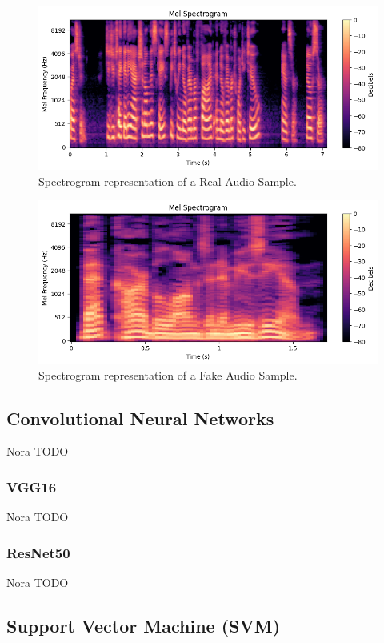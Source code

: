 \documentclass[sigconf,authordraft]{acmart}
\begin{document}
\begin{figure}
  \centering
  \includegraphics[width=\linewidth]{images/real_spectrogram.png}
  \caption{Spectrogram representation of a Real Audio Sample.}
  \label{fig:real_spectrogram}
\end{figure}

\begin{figure}
  \centering
  \includegraphics[width=\linewidth]{images/fake_spectrogram.png}
  \caption{Spectrogram representation of a Fake Audio Sample.}
  \label{fig:fake_spectrogram}
\end{figure}

\subsection{Convolutional Neural Networks}
Nora TODO
\subsubsection{VGG16}
Nora TODO
\subsubsection{ResNet50}
Nora TODO

\subsection{Support Vector Machine (SVM)}
\end{document}
